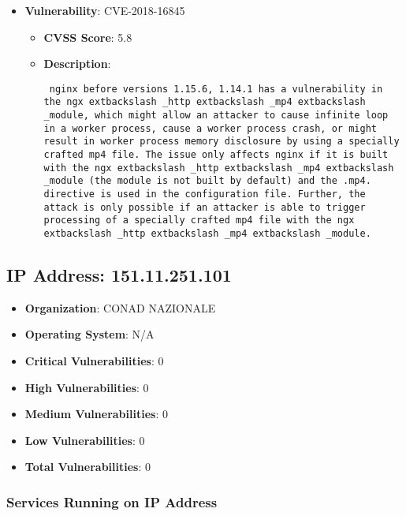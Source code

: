 \documentclass{article}
\begin{document}
\begin{itemize}
        \item \textbf{Vulnerability}: CVE-2018-16845
        \begin{itemize}
            \item \textbf{CVSS Score}:  5.8 
            \item \textbf{Description}: \parbox{\linewidth}{\texttt{ nginx before versions 1.15.6, 1.14.1 has a vulnerability in the ngx	extbackslash _http	extbackslash _mp4	extbackslash _module, which might allow an attacker to cause infinite loop in a worker process, cause a worker process crash, or might result in worker process memory disclosure by using a specially crafted mp4 file. The issue only affects nginx if it is built with the ngx	extbackslash _http	extbackslash _mp4	extbackslash _module (the module is not built by default) and the .mp4. directive is used in the configuration file. Further, the attack is only possible if an attacker is able to trigger processing of a specially crafted mp4 file with the ngx	extbackslash _http	extbackslash _mp4	extbackslash _module. }}
        \end{itemize}
    
\end{itemize}


\clearpage



\subsection*{IP Address: 151.11.251.101}

\begin{itemize}
    \item \textbf{Organization}: CONAD NAZIONALE
    \item \textbf{Operating System}:  N/A 
    \item \textbf{Critical Vulnerabilities}: 0
    \item \textbf{High Vulnerabilities}: 0
    \item \textbf{Medium Vulnerabilities}: 0
    \item \textbf{Low Vulnerabilities}: 0
    \item \textbf{Total Vulnerabilities}: 0
\end{itemize}

\subsubsection*{Services Running on IP Address}
\end{document}
